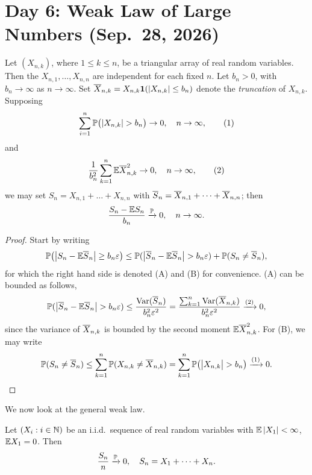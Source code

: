 \section{Day 6: Weak Law of Large Numbers (Sep.\ 28, 2026)}
\begin{theorem}[Durrett \S2.2.11] \label{thm:weak_lln_for_triangular_array}
    Let $(X_{n,k})$, where $1 \leq k \leq n$, be a triangular array of real random variables. Then the $X_{n,1}, \dots, X_{n,n}$ are independent for each fixed $n$. Let $b_n > 0$, with $b_n \to \infty$ as $n \to \infty$. Set $\overline X_{n,k} = X_{n,k} \mathbf 1(\left\lvert X_{n,k} \right\rvert \leq b_n)$ denote the \textit{truncation} of $X_{n,k}$. Supposing
    \[ \sum_{i=1}^n \mathbb P\bigl(\left\lvert X_{n,k} \right\rvert > b_n\bigr) \to 0, \quad n \to \infty, \tag{1} \]
    and
    \[ \frac{1}{b_n^2} \sum_{k=1}^n \mathbb E \overline X_{n,k}^2 \to 0, \quad n \to \infty, \tag{2} \]
    we may set $S_n = X_{n,1} + \dots + X_{n,n}$ with $\overline S_n = \overline X_{n,1} + \dots + \overline X_{n,n}$; then
    \[ \frac{S_n - \mathbb E S_n}{b_n} \xrightarrow{\mathbb P} 0, \quad n \to \infty. \]
\end{theorem} \vspace{-8pt}
\begin{proof}
    Start by writing
    \[ \mathbb P \bigl(\bigl\lvert S_n - \mathbb E \overline S_n \bigr\rvert \geq b_n \varepsilon\bigr) \leq \mathbb P(\bigl\lvert \overline S_n - \mathbb E \overline S_n \bigr\rvert > b_n \varepsilon) + \mathbb P(S_n \neq \overline S_n), \]
    for which the right hand side is denoted (A) and (B) for convenience. (A) can be bounded as follows,
    \[ \mathbb P(\bigl\lvert \overline S_n - \mathbb E \overline S_n \bigr\rvert > b_n \varepsilon) \leq \frac{\operatorname{Var}(\overline S_n)}{b_n^2 \varepsilon^2} = \frac{\sum_{k=1}^n \operatorname{Var}(\overline X_{n,k})}{b_n^2 \varepsilon^2} \xrightarrow{(2)} 0, \]
    since the variance of $\overline X_{n,k}$ is bounded by the second moment $\mathbb E \overline X_{n,k}^2$. For (B), we may write
    \[ \mathbb P(S_n \neq \overline S_n) \leq \sum_{k=1}^n \mathbb P(X_{n,k} \neq \overline X_{n,k}) = \sum_{k=1}^n \mathbb P\bigl(\bigl\lvert X_{n,k} \bigr\rvert > b_n\bigr) \xrightarrow{(1)} 0. \qedhere \]
\end{proof}

We now look at the general weak law.
\begin{theorem} \label{thm:weak_lln}
    Let $(X_i : i \in \mathbb N)$ be an i.i.d.\ sequence of real random variables with $\mathbb E \left\lvert X_1 \right\rvert < \infty$, $\mathbb E X_1 = 0$. Then
    \[ \frac{S_n}{n} \xrightarrow{\mathbb P} 0, \quad S_n = X_1 + \dots + X_n. \]
\end{theorem} \vspace{-8pt}

